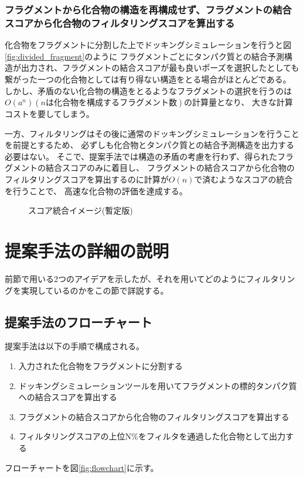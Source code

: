 \subsubsection{フラグメントから化合物の構造を再構成せず、フラグメントの結合スコアから化合物のフィルタリングスコアを算出する}
化合物をフラグメントに分割した上でドッキングシミュレーションを行うと図\ref{fig:divided_fragment}のように
フラグメントごとにタンパク質との結合予測構造が出力され、フラグメントの結合スコアが最も良いポーズを選択したとしても
繋がった一つの化合物としては有り得ない構造をとる場合がほとんどである。
しかし、矛盾のない化合物の構造をとるようなフラグメントの選択を行うのは$O(a^n) (nは化合物を構成するフラグメント数)$の計算量となり、
大きな計算コストを要してしまう。

一方、フィルタリングはその後に通常のドッキングシミュレーションを行うことを前提とするため、
必ずしも化合物とタンパク質との結合予測構造を出力する必要はない。
そこで、提案手法では構造の矛盾の考慮を行わず、得られたフラグメントの結合スコアのみに着目し、
フラグメントの結合スコアから化合物のフィルタリングスコアを算出するのに計算が$O(n)$で済むようなスコアの統合を行うことで、
高速な化合物の評価を達成する。


\begin{figure}[htb]
 \begin{center}
  \caption{スコア統合イメージ(暫定版)}
  \label{fig:integration_image}
 \end{center}
\end{figure}

\section{提案手法の詳細の説明}
前節で用いる2つのアイデアを示したが、それを用いてどのようにフィルタリングを実現しているのかをこの節で詳説する。

\subsection{提案手法のフローチャート}\label{subsec:flowchart}
提案手法は以下の手順で構成される。
\begin{enumerate}
\item 入力された化合物をフラグメントに分割する
\item ドッキングシミュレーションツールを用いてフラグメントの標的タンパク質への結合スコアを算出する
\item フラグメントの結合スコアから化合物のフィルタリングスコアを算出する
\item フィルタリングスコアの上位N\%をフィルタを通過した化合物として出力する
\end{enumerate}
フローチャートを図\ref{fig:flowchart}に示す。

